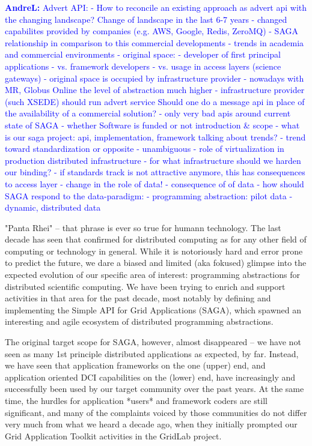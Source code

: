 \documentclass{article}
\newcommand{\B}[1]{\textbf{#1}}
\newcommand{\alnote}[1]{{\textcolor{blue}{    \B{AndreL:  } #1 }}}
\newcommand{\alnote}[1]{}
\begin{document}
\alnote{
Advert API:
- How to reconcile an existing approach as advert api with the changing landscape?
Change of landscape in the last 6-7 years
- changed capabilites provided by companies (e.g. AWS, Google, Redis, ZeroMQ)
- SAGA relationship in comparison to this commercial developments
- trends in academia and commercial environments
- original space:
     - developer of first principal applications
     - vs. framework developers
     - vs. usage in access layers (science gateways)
- original space is occupied by infrastructure provider
- nowadays with MR, Globus Online the level of abstraction much higher
- infrastructure provider (such XSEDE) should run advert service 
Should one do a message api in place of the availability of a commercial solution?
- only very bad apis around
current state of SAGA 
- whether Software is funded or not
introduction \& scope
- what is our saga project: api, implementation, framework
talking about trends?
- trend toward standardization or opposite
- unambiguous
- role of virtualization in production distributed infrastructure
- for what infrastructure should we harden our binding?
- if standards track is not attractive anymore, this has consequences to access layer
- change in the role of data!
- consequence of of data
- how should SAGA respond to the data-paradigm:
     - programming abstraction: pilot data
     - dynamic, distributed data
}

 "Panta Rhei" -- that phrase is ever so true for humann technology.
 The last decade has seen that confirmed for distributed computing as
 for any other field of computing or technology in general.  While it
 is notoriously hard and error prone to predict the future, we dare a
 biased and limited (aka fokused) glimpse into the expected evolution
 of our specific area of interest: programming abstractions for
 distributed scientific computing.  We have been trying to enrich and
 support activities in that area for the past decade, most notably by
 defining and implementing the Simple API for Grid Applications
 (SAGA), which spawned an interesting and agile ecosystem of
 distributed programming abstractions.

 The original target scope for SAGA, however, almost disappeared -- we
 have not seen as many 1st principle distributed applications as
 expected, by far.  Instead, we have seen that application frameworks
 on the one (upper) end, and application oriented DCI capabilities on
 the (lower) end, have increasingly and successfully been used by our
 target community over the past years.  At the same time, the hurdles
 for application *users* and framework coders are still significant,
 and many of the complaints voiced by those communities do not differ
 very much from what we heard a decade ago, when they initially
 prompted our Grid Application Toolkit activities in the GridLab
 project.
\end{document}

